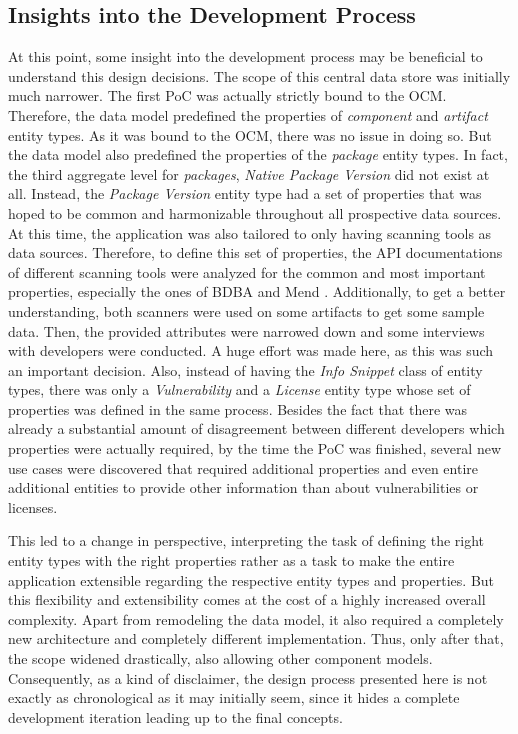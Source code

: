 \subsection{Insights into the Development Process} \label{sec:Insights into the Development Process}
At this point, some insight into the development process may be beneficial to understand this design decisions. The scope of this central data store was initially much narrower. The first PoC was actually strictly bound to the OCM. Therefore, the data model predefined the properties of \emph{component} and \emph{artifact} entity types. As it was bound to the OCM, there was no issue in doing so. But the data model also predefined the properties of the \emph{package} entity types. In fact, the third aggregate level for \emph{packages}, \emph{Native Package Version} did not exist at all. Instead, the \emph{Package Version} entity type had a set of properties that was hoped to be common and harmonizable throughout all prospective data sources. At this time, the application was also tailored to only having scanning tools as data sources. Therefore, to define this set of properties, the API documentations of different scanning tools were analyzed for the common and most important properties, especially the ones of BDBA and Mend \cite{MendAPI}. Additionally, to get a better understanding, both scanners were used on some artifacts to get some sample data. Then, the provided attributes were narrowed down and some interviews with developers were conducted. A huge effort was made here, as this was such an important decision. Also, instead of having the \emph{Info Snippet} class of entity types, there was only a \emph{Vulnerability} and a \emph{License} entity type whose set of properties was defined in the same process. Besides the fact that there was already a substantial amount of disagreement between different developers which properties were actually required, by the time the PoC was finished, several new use cases were discovered that required additional properties and even entire additional entities to provide other information than about vulnerabilities or licenses.\par
This led to a change in perspective, interpreting the task of defining the right entity types with the right properties rather as a task to make the entire application extensible regarding the respective entity types and properties. But this flexibility and extensibility comes at the cost of a highly increased overall complexity. Apart from remodeling the data model, it also required a completely new architecture and completely different implementation. Thus, only after that, the scope widened drastically, also allowing other component models. Consequently, as a kind of disclaimer, the design process presented here is not exactly as chronological as it may initially seem, since it hides a complete development iteration leading up to the final concepts.

